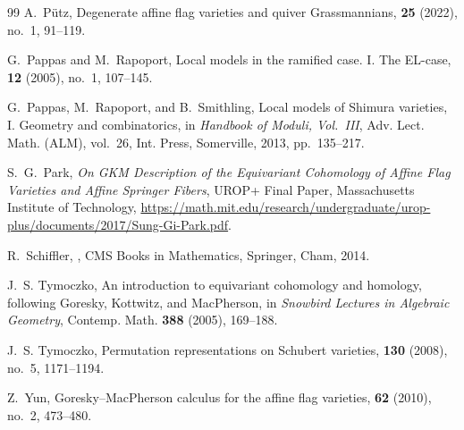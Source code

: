 \documentclass[10pt, a4paper, reqno]{amsart}
\begin{document}
\begin{thebibliography}{99}
	A.~P\"utz,
	\newblock Degenerate affine flag varieties and quiver Grassmannians,
	 {\bf 25} (2022), no.~1, 91--119.
	
	G.~Pappas and M.~Rapoport,
	\newblock Local models in the ramified case. I. The EL-case,
	 {\bf 12} (2005), no.~1, 107--145.
	
	G.~Pappas, M.~Rapoport, and B.~Smithling,
	\newblock Local models of Shimura varieties, I. Geometry and combinatorics,
	\newblock in {\em Handbook of Moduli, Vol.~III}, Adv. Lect. Math. (ALM), vol.~26, Int. Press, Somerville, 2013, pp.~135--217.
	
	S.~G.~Park,
	\textit{On GKM Description of the Equivariant Cohomology of Affine Flag Varieties and Affine Springer Fibers},
	UROP+ Final Paper, Massachusetts Institute of Technology, \url{https://math.mit.edu/research/undergraduate/urop-plus/documents/2017/Sung-Gi-Park.pdf}.
	
	R.~Schiffler,
	,
	\newblock CMS Books in Mathematics, Springer, Cham, 2014.
	
	J.~S. Tymoczko,
	\newblock An introduction to equivariant cohomology and homology, following Goresky, Kottwitz, and MacPherson,
	\newblock in {\em Snowbird Lectures in Algebraic Geometry}, Contemp. Math. {\bf 388} (2005), 169--188.
	
	J.~S. Tymoczko,
	\newblock Permutation representations on Schubert varieties,
	 {\bf 130} (2008), no.~5, 1171--1194.
	
	Z.~Yun,
	\newblock Goresky--MacPherson calculus for the affine flag varieties,
	 {\bf 62} (2010), no.~2, 473--480.
	

\end{thebibliography}
\end{document}
